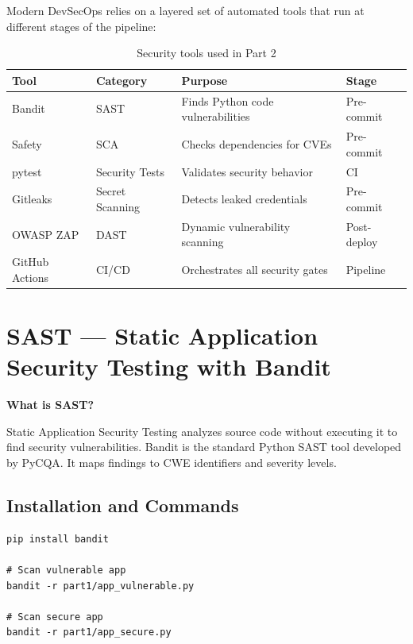 \documentclass[12pt,a4paper]{report}
\begin{document}
Modern DevSecOps relies on a layered set of automated tools that run at different stages of the pipeline:

\begin{table}[H]
\centering
\begin{tabularx}{\textwidth}{l l X l}
\toprule
\textbf{Tool} & \textbf{Category} & \textbf{Purpose} & \textbf{Stage} \\
\midrule
Bandit & SAST & Finds Python code vulnerabilities & Pre-commit \\
Safety & SCA & Checks dependencies for CVEs & Pre-commit \\
pytest & Security Tests & Validates security behavior & CI \\
Gitleaks & Secret Scanning & Detects leaked credentials & Pre-commit \\
OWASP ZAP & DAST & Dynamic vulnerability scanning & Post-deploy \\
GitHub Actions & CI/CD & Orchestrates all security gates & Pipeline \\
\bottomrule
\end{tabularx}
\caption{Security tools used in Part 2}
\end{table}

\section{SAST — Static Application Security Testing with Bandit}

\textbf{What is SAST?}

Static Application Security Testing analyzes source code without executing it to find security vulnerabilities. Bandit is the standard Python SAST tool developed by PyCQA. It maps findings to CWE identifiers and severity levels.

\subsection{Installation and Commands}

\begin{lstlisting}[style=bashstyle, caption={Installing and running Bandit}]
pip install bandit

# Scan vulnerable app
bandit -r part1/app_vulnerable.py

# Scan secure app
bandit -r part1/app_secure.py
\end{lstlisting}
\end{document}

